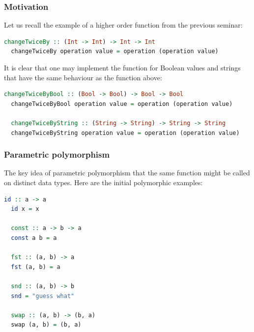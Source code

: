 \documentclass[10pt,pdf,utf8,russian,aspectratio=169]{beamer}
\begin{document}
\begin{frame}[fragile]
  \frametitle{Motivation}
  Let us recall the example of a higher order function from the previous seminar:

  \begin{lstlisting}[language=Haskell]
  changeTwiceBy :: (Int -> Int) -> Int -> Int
  changeTwiceBy operation value = operation (operation value)
  \end{lstlisting}

  \vspace{\baselineskip}

  It is clear that one may implement the function for Boolean values and strings that have the same behaviour as the function above:

  \begin{lstlisting}[language=Haskell]
  changeTwiceByBool :: (Bool -> Bool) -> Bool -> Bool
  changeTwiceByBool operation value = operation (operation value)

  changeTwiceByString :: (String -> String) -> String -> String
  changeTwiceByString operation value = operation (operation value)
  \end{lstlisting}

\end{frame}

\begin{frame}[fragile]
  \frametitle{Parametric polymorphism}

  The key idea of parametric polymorphism that the same function might be called on distinct data types. Here are the initial polymorphic examples:

  \begin{lstlisting}[language=Haskell]
  id :: a -> a
  id x = x

  const :: a -> b -> a
  const a b = a

  fst :: (a, b) -> a
  fst (a, b) = a

  snd :: (a, b) -> b
  snd = "guess what"

  swap :: (a, b) -> (b, a)
  swap (a, b) = (b, a)
  \end{lstlisting}
\end{frame}
\end{document}
